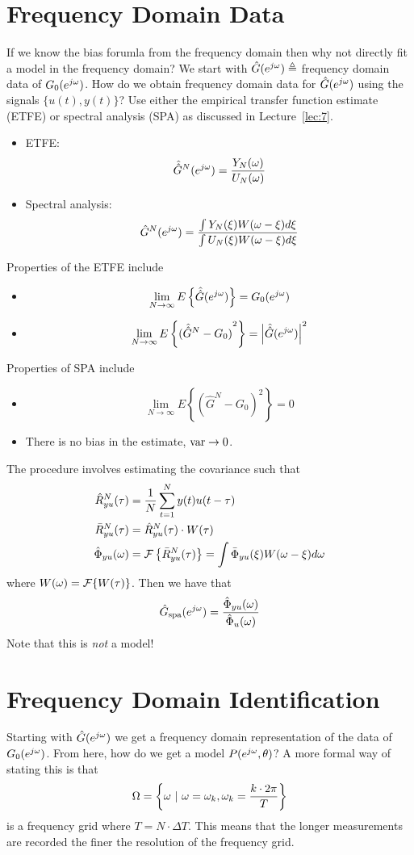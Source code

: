 \section{Frequency Domain Data}
If we know the bias forumla from the frequency domain then why not directly fit a model in the frequency domain? We start with $\hat{G}(e^{j\omega}) \triangleq$ frequency domain data of $G_0(e^{j\omega})$.
How do we obtain frequency domain data for $\hat{G}(e^{j\omega})$ using the signals $\{u(t),y(t)\}$? Use either the empirical transfer function estimate (ETFE) or spectral analysis (SPA) as discussed in Lecture~\ref{lec:7}.
\begin{itemize}
\item ETFE\@:
$$\hat{\hat{G}}^N(e^{j\omega}) = \frac{Y_N(\omega)}{U_N(\omega)}$$
\item Spectral analysis:
$$\hat{G}^N(e^{j\omega}) = \frac{\int Y_N(\xi)W(\omega-\xi)d\xi}{\int U_N(\xi)W(\omega-\xi)d\xi}$$
\end{itemize}
Properties of the ETFE include
\begin{itemize}
\item $$\lim_{N\to\infty}E\left\lbrace \hat{\hat{G}}(e^{j\omega})\right\rbrace = G_0(e^{j\omega})$$
\item $$\lim_{N\to\infty}E\left\lbrace {(\hat{\hat{G}}^N-G_0)}^2\right\rbrace = \left|\hat{\hat{G}}(e^{j\omega})\right|^2$$
\end{itemize}
Properties of SPA include
\begin{itemize}
\item $$\lim_{N\to\infty}E\left\lbrace {(\hat{G}^N-G_0)}^2\right\rbrace = 0$$
\item There is no bias in the estimate, $\text{var}\to0$.
\end{itemize}
The procedure involves estimating the covariance such that
\begin{align*}
\hat{R}_{yu}^N(\tau) &= \frac{1}{N}\sum_{t=1}^N y(t)u(t-\tau) \\
\bar{R}_{yu}^N(\tau) &= \hat{R}_{yu}^N(\tau)\cdot W(\tau) \\
\hat{\Phi}_{yu}(\omega) &= \mathcal{F}\left\lbrace \bar{R}_{yu}^N(\tau)\right\rbrace = \int\bar{\Phi}_{yu}(\xi) W(\omega-\xi)d\omega
\end{align*}
where $W(\omega) = \mathcal{F}\{W(\tau)\}$.
Then we have that
$$\hat{G}_{\text{spa}}(e^{j\omega}) = \frac{\hat{\Phi}_{yu}(\omega)}{\hat{\Phi}_u(\omega)}$$
Note that this is \textit{not} a model!

\section{Frequency Domain Identification}
Starting with $\hat{G}(e^{j\omega})$ we get a frequency domain representation of the data of $G_0(e^{j\omega})$.
From here, how do we get a model $P(e^{j\omega},\theta)$? A more formal way of stating this is that
$$\Omega = \left\lbrace \omega~|~\omega=\omega_k, \omega_k=\frac{k\cdot 2\pi}{T} \right\rbrace$$
is a frequency grid where $T=N\cdot\Delta T$.
This means that the longer measurements are recorded the finer the resolution of the frequency grid.


